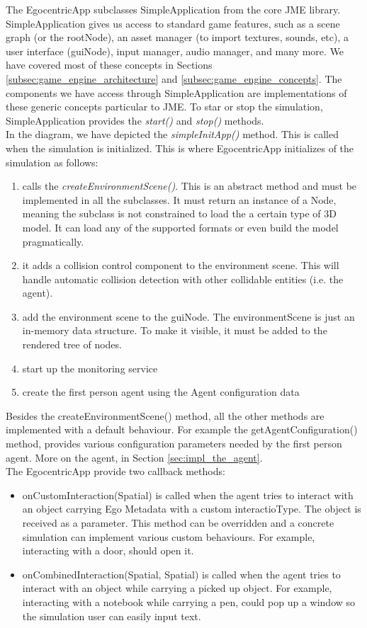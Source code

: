The EgocentricApp subclasses SimpleApplication from the core JME library.  SimpleApplication  gives us access to standard game features, such as a scene graph (or the rootNode), an asset manager (to import textures, sounds, etc), a user interface (guiNode), input manager, audio manager, and many more. We have covered most of these concepts in Sections \ref{subsec:game_engine_architecture} and \ref{subsec:game_engine_concepts}. The components we have access through SimpleApplication are implementations of these generic concepts particular to JME. To star or stop the simulation, SimpleApplication provides the \emph{start()} and \emph{stop()} methods.\\

In the diagram, we have depicted the \emph{simpleInitApp()} method. This is called when the simulation is initialized. This is where EgocentricApp initializes of the simulation as follows:
\begin{enumerate}
	\item calls the \emph{createEnvironmentScene()}. This is an abstract method and must be implemented in all the subclasses. It must return an instance of a Node, meaning the subclass is not constrained to load the a certain type of 3D model. It can load any of the supported formats or even build the model pragmatically.
	\item it adds a collision control component to the environment scene. This will handle automatic collision detection with other collidable entities (i.e. the agent).
	\item add the environment scene to the guiNode. The environmentScene is just an in-memory data structure. To make it visible, it must be added to the rendered tree of nodes.
	\item start up the monitoring service
	\item create the first person agent using the Agent configuration data 
\end{enumerate}

Besides the createEnvironmentScene() method, all the other methods are implemented with a default behaviour. For example the getAgentConfiguration() method, provides various configuration parameters needed by the first person agent. More on the agent, in Section \ref{sec:impl_the_agent}.\\

The EgocentricApp provide two callback methods:
\begin{itemize}
	\item onCustomInteraction(Spatial) is called when the agent tries to interact with an object carrying Ego Metadata with a custom interactioType. The object is received as a parameter. This method can be overridden and a concrete simulation can implement various custom behaviours. For example, interacting with a door, should open it.
	\item onCombinedInteraction(Spatial, Spatial) is called when the agent tries to interact with an object while carrying a picked up object. For example, interacting with a notebook while carrying a pen, could pop up a window so the simulation user can easily input text.
\end{itemize}

